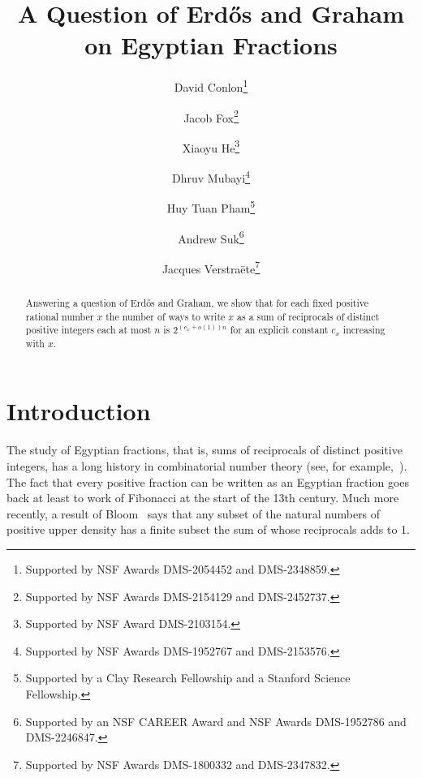\documentclass{daj}
\begin{document}
\begin{frontmatter}[classification=text]

\title{A Question of Erd\H{o}s and Graham on Egyptian Fractions} %

\author[dc]{David Conlon\thanks{Supported by NSF Awards DMS-2054452 and DMS-2348859.}}
\author[jf]{Jacob Fox\thanks{Supported by NSF Awards DMS-2154129 and DMS-2452737.}}
\author[xh]{Xiaoyu He\thanks{Supported by NSF Award DMS-2103154.}}
\author[dm]{Dhruv Mubayi\thanks{Supported by NSF Awards DMS-1952767 and DMS-2153576.}}
\author[htp]{Huy Tuan Pham\thanks{Supported by a Clay Research Fellowship and a Stanford Science Fellowship.}}
\author[as]{Andrew Suk\thanks{Supported by an NSF CAREER Award and NSF Awards DMS-1952786 and DMS-2246847.}}
\author[jv]{Jacques Verstra\"ete\thanks{Supported by NSF Awards DMS-1800332 and DMS-2347832.}}

\begin{abstract}
Answering a question of Erd\H{o}s and Graham,  we show that for each fixed positive rational number $x$ the number of ways to write $x$ as a sum of reciprocals of distinct positive integers each at most $n$ is $2^{(c_x + o(1))n}$ for an explicit constant $c_x$ increasing with $x$.
\end{abstract}
\end{frontmatter}

\section{Introduction}

The study of Egyptian fractions, that is, sums of reciprocals of distinct positive integers, has a long history in combinatorial number theory (see, for example,~\cite{BE22}). The fact that every positive fraction can be written as an Egyptian fraction goes back at least to work of Fibonacci at the start of the 13th century. Much more recently, a result of Bloom~\cite{Bl21} says that any subset of the natural numbers of positive upper density has a finite subset the sum of whose reciprocals adds to 1.
\end{document}
